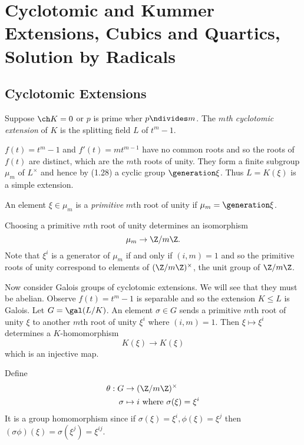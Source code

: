 \documentclass[a4paper]{article}
\begin{document}
\section{Cyclotomic and Kummer Extensions, Cubics and Quartics, Solution by Radicals}

\subsection{Cyclotomic Extensions}

\begin{definition}
  Suppose \(\ch K = 0\) or \(p\) is prime wher \(p \ndivides m\). The \emph{\(m\)th cyclotomic extension} of \(K\) is the splitting field \(L\) of \(t^m - 1\).
\end{definition}

\begin{remark}
  \(f(t) = t^m - 1\) and \(f'(t) = mt^{m - 1}\) have no common roots and so the roots of \(f(t)\) are distinct, which are the \(m\)th roots of unity. They form a finite subgroup \(\mu_m\) of \(L^\times\) and hence by (1.28)  a cyclic group \(\generation \xi\). Thus \(L = K(\xi)\) is a simple extension.
\end{remark}

\begin{definition}
  An element \(\xi \in \mu_m\) is a \emph{primitive} \(m\)th root of unity if \(\mu_m = \generation \xi\).
\end{definition}

Choosing a primitive \(m\)th root of unity determines an isomorphism
\[
  \mu_m \to \Z/m\Z.
\]
Note that \(\xi^i\) is a generator of \(\mu_m\) if and only if \((i, m) = 1\) and so the primitive roots of unity correspond to elements of \((\Z/m\Z)^\times\), the unit group of \(\Z/m\Z\).

Now consider Galois groups of cyclotomic extensions. We will see that they must be abelian. Observe \(f(t) = t^m - 1\) is separable and so the extension \(K \leq L\) is Galois. Let \(G = \gal(L/K)\). An element \(\sigma \in G\) sends a primitive \(m\)th root of unity \(\xi\) to another \(m\)th root of unity \(\xi^i\) where \((i, m) = 1\). Then \(\xi \mapsto \xi^i\) determines a \(K\)-homomorphism
\[
  K(\xi) \to K(\xi)
\]
which is an injective map.

\begin{definition}
  Define
  \begin{align*}
    \theta: G &\to (\Z/m\Z)^\times \\
    \sigma &\mapsto i \text{ where } \sigma(\xi) = \xi^i
  \end{align*}
  It is a group homomorphism since if \(\sigma(\xi) = \xi^i, \phi(\xi) = \xi^j\) then \((\sigma\phi)(\xi) = \sigma(\xi^j) = \xi^{ij}\).
\end{definition}
\end{document}
